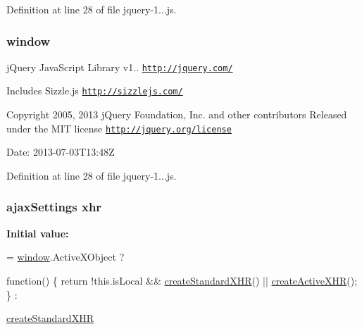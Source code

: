 Definition at line 28 of file jquery-\/1...\+js.

\hypertarget{obj_2_release_2_package_2_package_tmp_2_scripts_2jquery-1_810_82_8js_a04a8a2bbfa9c15500892b8e5033d625b}{}
\subsubsection[{window}]{\setlength{\rightskip}{0pt plus 5cm}window}\label{obj_2_release_2_package_2_package_tmp_2_scripts_2jquery-1_810_82_8js_a04a8a2bbfa9c15500892b8e5033d625b}
j\+Query Java\+Script Library v1.. \href{http://jquery.com/}{\tt http\+://jquery.\+com/}

Includes Sizzle.\+js \href{http://sizzlejs.com/}{\tt http\+://sizzlejs.\+com/}

Copyright 2005, 2013 j\+Query Foundation, Inc. and other contributors Released under the M\+I\+T license \href{http://jquery.org/license}{\tt http\+://jquery.\+org/license}

Date\+: 2013-\/07-\/03\+T13\+:48\+Z 

Definition at line 28 of file jquery-\/1...\+js.

\hypertarget{obj_2_release_2_package_2_package_tmp_2_scripts_2jquery-1_810_82_8js_a0b7a5cb538ca9913b1b3b1c807ad06f0}{}
\subsubsection[{xhr}]{ ajax\+Settings xhr}\label{obj_2_release_2_package_2_package_tmp_2_scripts_2jquery-1_810_82_8js_a0b7a5cb538ca9913b1b3b1c807ad06f0}
{\bfseries Initial value\+:}
\begin{DoxyCode}
= \hyperlink{obj_2_release_2_package_2_package_tmp_2_scripts_2jquery-1_810_82_8js_a04a8a2bbfa9c15500892b8e5033d625b}{window}.ActiveXObject ?
    
    \textcolor{keyword}{function}() \{
        \textcolor{keywordflow}{return} !this.isLocal && \hyperlink{obj_2_release_2_package_2_package_tmp_2_scripts_2jquery-1_810_82_8js_acea019a8b67e4d114deb75d1e0b3474a}{createStandardXHR}() || 
      \hyperlink{obj_2_release_2_package_2_package_tmp_2_scripts_2jquery-1_810_82_8js_a54bf63f1b5f905292db45a1d6a9dc300}{createActiveXHR}();
    \} :
    
    \hyperlink{obj_2_release_2_package_2_package_tmp_2_scripts_2jquery-1_810_82_8js_acea019a8b67e4d114deb75d1e0b3474a}{createStandardXHR}
\end{DoxyCode}


